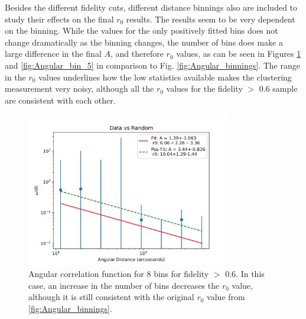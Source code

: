 
Besides the different fidelity cuts, different distance binnings also are included to study their effects on the final $r_0$ results. The results seem to be very dependent on the binning. While the values for the only positively fitted bins does not change dramatically as the binning changes, the number of bins does make a large difference in the final $A$, and therefore $r_0$ values, as can be seen in Figures \ref{fig:Angular_bin_8} and \ref{fig:Angular_bin_5} in comparison to Fig. \ref{fig:Angular_binnings}. The range in the $r_0$ values underlines how the low statistics available makes the clustering measurement very noisy, although all the $r_0$ values for the fidelity $>$ 0.6 sample are consistent with each other. 

\begin{figure}[!htbp]
\centering \includegraphics[width=90mm]{clustering_two/Data_vs_Random_20000_bin8_sn0_6_NFalse.png}
\caption{Angular correlation function for 8 bins  for fidelity $>$ 0.6. In this case, an increase in the number of bins decreases the $r_0$ value, although it is still consistent with the original $r_0$ value from \ref{fig:Angular_binnings}.}
\label{fig:Angular_bin_8}
\end{figure}

